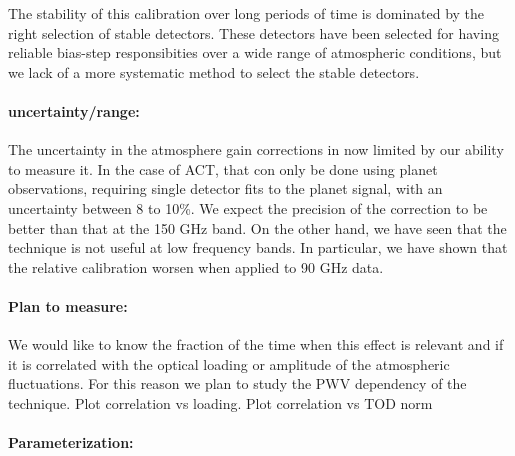 The stability of this calibration over long periods of time is dominated by the right selection of stable detectors. These detectors have been selected for having reliable bias-step responsibities over a wide range of atmospheric conditions, but we lack of a more systematic method to select the stable detectors. 

\paragraph{uncertainty/range:}
The uncertainty in the atmosphere gain corrections in now limited by our ability to measure it. In the case of ACT, that con only be done using planet observations, requiring single detector fits to the planet signal, with an uncertainty between 8 to 10\%. We expect the precision of the correction to be better than that at the 150 GHz band. On the other hand, we have seen that the technique is not useful at low frequency bands. In particular, we have shown that the relative calibration worsen when applied to 90 GHz data.


\paragraph{Plan to measure:}
We would like to know the fraction of the time when this effect is relevant and if it is correlated with the optical loading or amplitude of the atmospheric fluctuations. For this reason we plan to study the PWV dependency of the technique. Plot correlation vs loading. Plot correlation vs TOD norm

\paragraph{Parameterization:}
